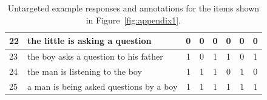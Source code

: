 \documentclass[12pt,notitlepage]{article}
\begin{document}
\begin{table}[h]
\begin{center}
\begin{tabular}{|l|p{11cm}|c|c|c|c|c|c|}
\hline
22 & the little is asking a question & 0 & 0 & 0 & 0 & 0 & 0 \\
\hline
23 & the boy asks a question to his father & 1 & 0 & 1 & 1 & 0 & 1 \\
\hline
24 & the man is listening to the boy & 1 & 1 & 1 & 0 & 1 & 0 \\
\hline
25 & a man is being asked questions by a boy & 1 & 1 & 1 & 1 & 1 & 1 \\
\hline
\end{tabular}
\end{center}
\caption{Untargeted example responses and annotations for the items shown in Figure~\ref{fig:appendix1}.}
\label{tab:untargeted}
\end{table}



\end{document}
